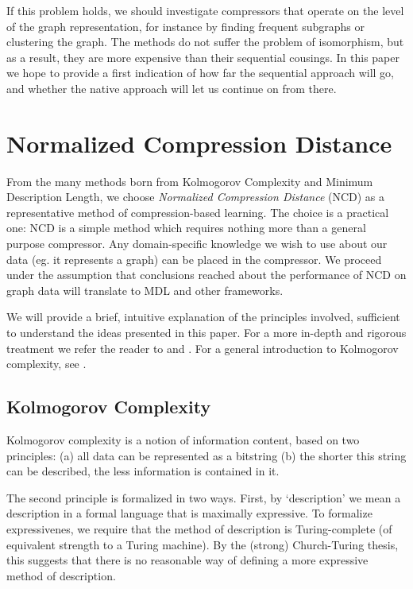 \documentclass[10pt,a4paper,oneside]{article}
\begin{document}
If this problem holds, we should investigate compressors that operate on the level of the graph representation, for instance by finding frequent subgraphs or clustering the graph. The methods do not suffer the problem of isomorphism, but as a result, they are more expensive than their sequential cousings. In this paper we hope to provide a first indication of how far the sequential approach will go, and whether the native approach will let us continue on from there.

\section*{Normalized Compression Distance}

From the many methods born from Kolmogorov Complexity and Minimum Description Length, we choose \emph{Normalized Compression Distance} (NCD) as a representative method of compression-based learning. The choice is a practical one: NCD is a simple method which requires nothing more than a general purpose compressor. Any domain-specific knowledge we wish to use about our data (eg. it represents a graph) can be placed in the compressor. We proceed under the assumption that conclusions reached about the performance of NCD on graph data will translate to MDL and other frameworks.

We will provide a brief, intuitive explanation of the principles involved, sufficient to understand the ideas presented in this paper. For a more in-depth and rigorous treatment we refer the reader to \cite{li2004similarity} and \cite{cilibrasi2005clustering}. For a general introduction to Kolmogorov complexity, see \cite{li1997introduction}.

\subsection*{Kolmogorov Complexity}

Kolmogorov complexity is a notion of information content, based on two principles: (a) all data can be represented as a bitstring (b) the shorter this string can be described, the less information is contained in it.

The second principle is formalized in two ways. First, by `description' we mean a description in a formal language that is maximally expressive. To formalize expressivenes, we require that the method of description is Turing-complete (of equivalent strength to a Turing machine). By the (strong) Church-Turing thesis, this suggests that there is no reasonable way of defining a more expressive method of description.
\end{document}
